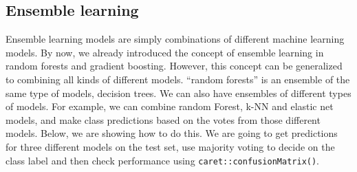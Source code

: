 \documentclass[12pt,]{krantz}
\newenvironment{Shaded}{\begin{snugshade}}{\end{snugshade}}
\newcommand{\CommentTok}[1]{\textcolor[rgb]{0.56,0.35,0.01}{\textit{#1}}}
\newcommand{\ControlFlowTok}[1]{\textcolor[rgb]{0.13,0.29,0.53}{\textbf{#1}}}
\newcommand{\DataTypeTok}[1]{\textcolor[rgb]{0.13,0.29,0.53}{#1}}
\newcommand{\DecValTok}[1]{\textcolor[rgb]{0.00,0.00,0.81}{#1}}
\newcommand{\KeywordTok}[1]{\textcolor[rgb]{0.13,0.29,0.53}{\textbf{#1}}}
\newcommand{\NormalTok}[1]{#1}
\newcommand{\OperatorTok}[1]{\textcolor[rgb]{0.81,0.36,0.00}{\textbf{#1}}}
\newcommand{\StringTok}[1]{\textcolor[rgb]{0.31,0.60,0.02}{#1}}
\begin{document}
\hypertarget{ensemble-learning}{%
\subsection{Ensemble learning}\label{ensemble-learning}}

Ensemble learning models are simply combinations of different machine learning models. By now, we already introduced the concept of ensemble learning in random forests and gradient boosting. However, this concept can be generalized to combining all kinds of different models. ``random forests'' is an ensemble of the same type of models, decision trees. We can also have ensembles of different types of models. For example, we can combine random Forest, k-NN and elastic net models, and make class predictions based on the votes from those different models. Below, we are showing how to do this. We are going to get predictions for three different models on the test set, use majority voting to decide on the class label and then check performance using \texttt{caret::confusionMatrix()}.

\begin{Shaded}
\end{Shaded}
\end{document}
